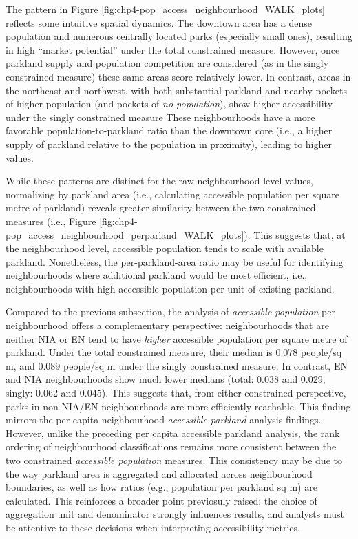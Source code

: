\documentclass[
11pt, %
oneside, %
english, %
singlespacing, %
]{macthesis} %
\begin{document}
The pattern in Figure \ref{fig:chp4-pop_access_neighbourhood_WALK_plots} reflects some intuitive spatial dynamics. The downtown area has a dense population and numerous centrally located parks (especially small ones), resulting in high ``market potential'' under the total constrained measure. However, once parkland supply and population competition are considered (as in the singly constrained measure) these same areas score relatively lower. In contrast, areas in the northeast and northwest, with both substantial parkland and nearby pockets of higher population (and pockets of \emph{no population}), show higher accessibility under the singly constrained measure These neighbourhoods have a more favorable population-to-parkland ratio than the downtown core (i.e., a higher supply of parkland relative to the population in proximity), leading to higher values.

While these patterns are distinct for the raw neighbourhood level values, normalizing by parkland area (i.e., calculating accessible population per square metre of parkland) reveals greater similarity between the two constrained measures (i.e., Figure \ref{fig:chp4-pop_access_neighbourhood_perparland_WALK_plots}). This suggests that, at the neighbourhood level, accessible population tends to scale with available parkland. Nonetheless, the per-parkland-area ratio may be useful for identifying neighbourhoods where additional parkland would be most efficient, i.e., neighbourhoods with high accessible population per unit of existing parkland.

Compared to the previous subsection, the analysis of \emph{accessible population} per neighbourhood offers a complementary perspective: neighbourhoods that are neither NIA or EN tend to have \emph{higher} accessible population per square metre of parkland. Under the total constrained measure, their median is 0.078 people/sq m, and 0.089 people/sq m under the singly constrained measure. In contrast, EN and NIA neighbourhoods show much lower medians (total: 0.038 and 0.029, singly: 0.062 and 0.045). This suggests that, from either constrained perspective, parks in non-NIA/EN neighbourhoods are more efficiently reachable. This finding mirrors the per capita neighbourhood \emph{accessible parkland} analysis findings. However, unlike the preceding per capita accessible parkland analysis, the rank ordering of neighbourhood classifications remains more consistent between the two constrained \emph{accessible population} measures. This consistency may be due to the way parkland area is aggregated and allocated across neighbourhood boundaries, as well as how ratios (e.g., population per parkland sq m) are calculated. This reinforces a broader point previosuly raised: the choice of aggregation unit and denominator strongly influences results, and analysts must be attentive to these decisions when interpreting accessibility metrics.
\end{document}
